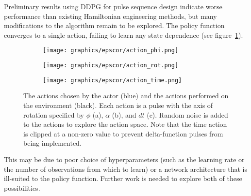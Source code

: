\documentclass{article}
\begin{document}
Preliminary results using DDPG for pulse sequence design indicate worse performance than existing Hamiltonian engineering methods, but many modifications to the algorithm remain to be explored.
The policy function converges to a single action, failing to learn any state dependence (see figure~\ref{fig:actions}).
\begin{figure}
    \centering
    \begin{subfigure}{.48\textwidth}
        \centering
        \texttt{[image: graphics/epscor/action\_phi.png]}
        \caption{}
    \end{subfigure}
    \begin{subfigure}{.48\textwidth}
        \centering
        \texttt{[image: graphics/epscor/action\_rot.png]}
        \caption{}
    \end{subfigure}
    \begin{subfigure}{.48\textwidth}
        \centering
        \texttt{[image: graphics/epscor/action\_time.png]}
        \caption{}
    \end{subfigure}
    \caption{The actions chosen by the actor (blue) and the actions performed on the environment (black). Each action is a pulse with the axis of rotation specified by $\phi$ (a), $\alpha$ (b), and $dt$ (c). Random noise is added to the actions to explore the action space. Note that the time action is clipped at a non-zero value to prevent delta-function pulses from being implemented.}
    \label{fig:actions}
\end{figure}
This may be due to poor choice of hyperparameters (such as the learning rate or the number of observations from which to learn) or a network architecture that is ill-suited to the policy function. Further work is needed to explore both of these possibilities.

\printbibliography
\end{document}
